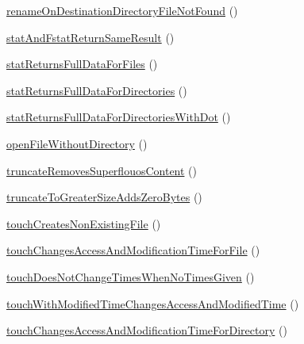 \begin{DoxyCompactItemize}
\item 
\mbox{\hyperlink{classorg_1_1bovigo_1_1vfs_1_1vfs_stream_wrapper_test_case_a6f320de32274e696a112ff12be244d90}{rename\+On\+Destination\+Directory\+File\+Not\+Found}} ()
\item 
\mbox{\hyperlink{classorg_1_1bovigo_1_1vfs_1_1vfs_stream_wrapper_test_case_a0f0b2aa83be6cad97a0a0cdddcc54152}{stat\+And\+Fstat\+Return\+Same\+Result}} ()
\item 
\mbox{\hyperlink{classorg_1_1bovigo_1_1vfs_1_1vfs_stream_wrapper_test_case_ac1685bd745572e1c7106dfed1ef8c1f0}{stat\+Returns\+Full\+Data\+For\+Files}} ()
\item 
\mbox{\hyperlink{classorg_1_1bovigo_1_1vfs_1_1vfs_stream_wrapper_test_case_ab897bb0fca98a6cd9d687466d25692d6}{stat\+Returns\+Full\+Data\+For\+Directories}} ()
\item 
\mbox{\hyperlink{classorg_1_1bovigo_1_1vfs_1_1vfs_stream_wrapper_test_case_a010db3a8f70db0f0db4cf83458dd6cf5}{stat\+Returns\+Full\+Data\+For\+Directories\+With\+Dot}} ()
\item 
\mbox{\hyperlink{classorg_1_1bovigo_1_1vfs_1_1vfs_stream_wrapper_test_case_aa28b531a1508ed8807252eead4d59863}{open\+File\+Without\+Directory}} ()
\item 
\mbox{\hyperlink{classorg_1_1bovigo_1_1vfs_1_1vfs_stream_wrapper_test_case_a6f20716fec7bacf7ebb3b6f15d85aa62}{truncate\+Removes\+Superflouos\+Content}} ()
\item 
\mbox{\hyperlink{classorg_1_1bovigo_1_1vfs_1_1vfs_stream_wrapper_test_case_a1aa5a7b6c72ceefd965573f4408452be}{truncate\+To\+Greater\+Size\+Adds\+Zero\+Bytes}} ()
\item 
\mbox{\hyperlink{classorg_1_1bovigo_1_1vfs_1_1vfs_stream_wrapper_test_case_aa330e7787d4da0dcf57946acc5fa58c9}{touch\+Creates\+Non\+Existing\+File}} ()
\item 
\mbox{\hyperlink{classorg_1_1bovigo_1_1vfs_1_1vfs_stream_wrapper_test_case_a4fe603a2b9920dce06c2ad94c63e5580}{touch\+Changes\+Access\+And\+Modification\+Time\+For\+File}} ()
\item 
\mbox{\hyperlink{classorg_1_1bovigo_1_1vfs_1_1vfs_stream_wrapper_test_case_a9c2e82e378b87d8a81de9f6199a56b5a}{touch\+Does\+Not\+Change\+Times\+When\+No\+Times\+Given}} ()
\item 
\mbox{\hyperlink{classorg_1_1bovigo_1_1vfs_1_1vfs_stream_wrapper_test_case_aaf8d054640d3ca9e898de34a777a58eb}{touch\+With\+Modified\+Time\+Changes\+Access\+And\+Modified\+Time}} ()
\item 
\mbox{\hyperlink{classorg_1_1bovigo_1_1vfs_1_1vfs_stream_wrapper_test_case_aa24fb4eb106e7c67726c2bd707bd22f6}{touch\+Changes\+Access\+And\+Modification\+Time\+For\+Directory}} ()
\end{DoxyCompactItemize}
